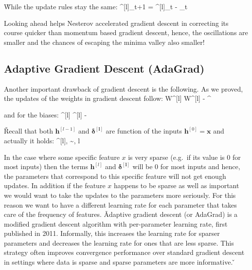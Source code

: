 \v

While the update rules stay the same:
\bse
\theta^{[l]}_{t+1} = \theta^{[l]}_t - \alpha [V_{\theta^{[l]}}]_t
\ese

Looking ahead helps Nesterov accelerated gradient descent in correcting its course quicker than momentum based
gradient descent, hence, the oscillations are smaller and the chances of escaping the minima valley also smaller!

\subsection{Adaptive Gradient Descent (AdaGrad)}

Another important drawback of gradient descent is the following. As we proved, the updates of the weights in gradient
descent follow:
\bse
W^{[l]} \coloneqq W^{[l]} - \alpha \cdot\boldsymbol{\delta^{[l]}} ^{\intercal}
\ese

and for the biases:
\bse
{}^{[l]} \coloneqq {}^{[l]} - \alpha \cdot \boldsymbol{\delta^{[l]}}
\ese

\v

Recall that both ${\boldsymbol{h}^{[l-1]}}$ and $\boldsymbol{\delta^{[l]}}$ are function of the inputs
${\boldsymbol{h}^{[0]}} = \boldsymbol{x}$ and actually it holds:
\bse
{^{[l]}}, \boldsymbol{\delta^{[l]}} \sim {}, \:\:\: \forall l
\ese

In the case where some specific feature $x$ is very sparse (e.g.\ if its value is 0 for most inputs) then the terms
${\boldsymbol{h}^{[l]}}$ and $\boldsymbol{\delta^{[l]}}$ will be 0 for most inputs and hence, the parameters that
correspond to this specific feature will not get enough updates. In addition if the feature $x$ happens to be sparse
as well as important we would want to take the updates to the parameters more seriously. For this reason we want to
have a different learning rate for each parameter that takes care of the frequency of features. \v

Adaptive gradient descent (or AdaGrad) is a modified gradient descent algorithm with per-parameter learning rate,
first published in 2011. Informally, this increases the learning rate for sparser parameters and decreases the
learning rate for ones that are less sparse. This strategy often improves convergence performance over standard
gradient descent in settings where data is sparse and sparse parameters are more informative. \v


